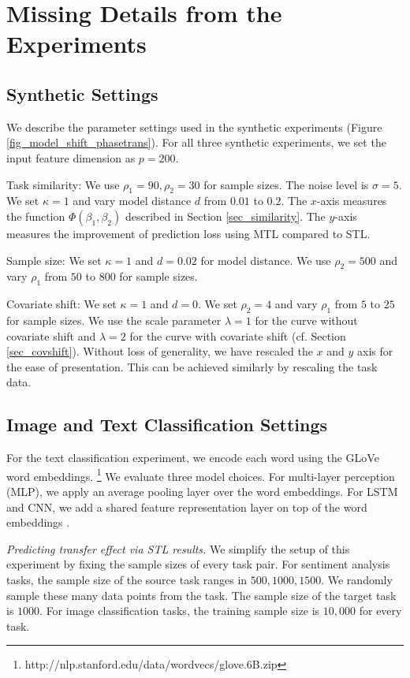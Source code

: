 \section{Missing Details from the Experiments}\label{app_experiments}


\subsection{Synthetic Settings}\label{app_synthetic}
	We describe the parameter settings used in the synthetic experiments (Figure \ref{fig_model_shift_phasetrans}).
	For all three synthetic experiments, we set the input feature dimension as $p = 200$.
	\squishlist
		\item Task similarity: We use $\rho_1 = 90, \rho_2 = 30$ for sample sizes.
	The noise level is $\sigma = 5$.
	We set $\kappa = 1$ and vary model distance $d$ from $0.01$ to $0.2$.
	The $x$-axis measures the function $\Phi(\beta_1, \beta_2)$ described in Section \ref{sec_similarity}.
	The $y$-axis measures the improvement of prediction loss using MTL compared to STL.
		\item Sample size: We set $\kappa = 1$ and $d = 0.02$ for model distance.
	We use $\rho_2 = 500$ and vary $\rho_1$ from $50$ to $800$ for sample sizes.
		\item Covariate shift: We set $\kappa = 1$ and $d = 0$.
	We set $\rho_2 = 4$ and vary $\rho_1$ from $5$ to $25$ for sample sizes.
	We use the scale parameter $\lambda = 1$ for the curve without covariate shift and $\lambda = 2$ for the curve with covariate shift (cf. Section \ref{sec_covshift}).
	Without loss of generality, we have rescaled the $x$ and $y$ axis for the ease of presentation.
	This can be achieved similarly by rescaling the task data.
	\squishend

\subsection{Image and Text Classification Settings}\label{app_it}

For the text classification experiment, we encode each word using the GLoVe word embeddings.%
\footnote{http://nlp.stanford.edu/data/wordvecs/glove.6B.zip}
We evaluate three model choices.
For multi-layer perception (MLP), we apply an average pooling layer over the word embeddings.
For LSTM and CNN, we add a shared feature representation layer on top of the word embeddings \cite{lei2018simple}.

\textit{Predicting transfer effect via STL results.}
We simplify the setup of this experiment by fixing the sample sizes of every task pair.
For sentiment analysis tasks, the sample size of the source task ranges in $500, 1000, 1500$.
We randomly sample these many data points from the task.
The sample size of the target task is $1000$.
For image classification tasks, the training sample size is $10,000$ for every task.

